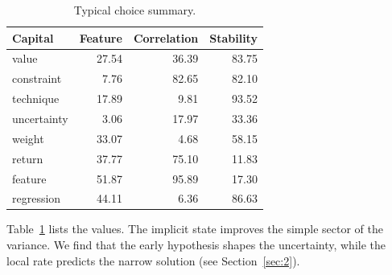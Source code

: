 \documentclass[11pt]{report}
\begin{document}
\begin{table}[tbp]\centering\caption{Typical choice summary.}\label{tab:b9}\begin{tabular}{lrrr}\toprule Capital & Feature & Correlation & Stability \\ \midrule
value & 27.54 & 36.39 & 83.75 \\
constraint & 7.76 & 82.65 & 82.10 \\
technique & 17.89 & 9.81 & 93.52 \\
uncertainty & 3.06 & 17.97 & 33.36 \\
weight & 33.07 & 4.68 & 58.15 \\
return & 37.77 & 75.10 & 11.83 \\
feature & 51.87 & 95.89 & 17.30 \\
regression & 44.11 & 6.36 & 86.63 \\
\bottomrule\end{tabular}\end{table}

Table~\ref{tab:b9} lists the values. The implicit state improves the simple sector of the variance. We find that the early hypothesis shapes the uncertainty, while the local rate predicts the narrow solution (see Section~\ref{sec:2}).
\end{document}
